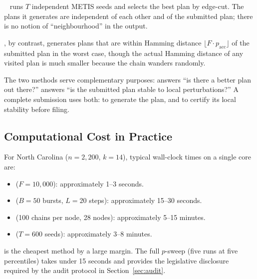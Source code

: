 \cs{}~\citep{b11paper} runs $T$ independent METIS seeds and selects the
best plan by edge-cut.
The plans it generates are independent of each other and of the submitted plan;
there is no notion of ``neighbourhood'' in the \cs{} output.

\flip{}, by contrast, generates plans that are within Hamming distance
$\lfloor F \cdot p_{\mathrm{acc}} \rfloor$ of the submitted plan in the
worst case, though the actual Hamming distance of any visited plan is much
smaller because the chain wanders randomly.

The two methods serve complementary purposes:
\cs{} answers ``is there a better plan out there?''
\flip{} answers ``is the submitted plan stable to local perturbations?''
A complete submission uses both: \cs{} to generate the plan, and \flip{}
to certify its local stability before filing.

\subsection{Computational Cost in Practice}

For North Carolina ($n = 2{,}200$, $k = 14$), typical wall-clock times
on a single core are:
\begin{itemize}
  \item \flip{} ($F = 10{,}000$): approximately 1--3 seconds.
  \item \sburst{} ($B = 50$ bursts, $L = 20$ steps): approximately 15--30 seconds.
  \item \be{} (100 chains per node, 28 nodes): approximately 5--15 minutes.
  \item \cs{} ($T = 600$ seeds): approximately 3--8 minutes.
\end{itemize}
\flip{} is the cheapest method by a large margin.
The full $p$-sweep (five \flip{} runs at five percentiles) takes under 15
seconds and provides the legislative disclosure required by the audit protocol
in Section~\ref{sec:audit}.

